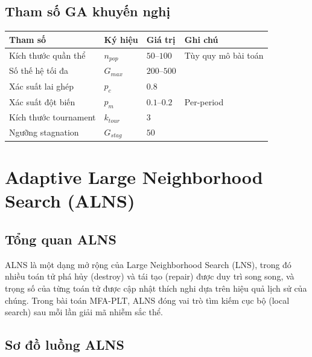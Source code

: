 \documentclass[12pt]{article}
\begin{document}
\subsection{Tham số GA khuyến nghị}

\begin{center}
\begin{tabular}{llll}
\toprule
\textbf{Tham số} & \textbf{Ký hiệu} & \textbf{Giá trị} & \textbf{Ghi chú} \\
\midrule
Kích thước quần thể & $n_{pop}$ & $50$--$100$ & Tùy quy mô bài toán \\
Số thế hệ tối đa & $G_{max}$ & $200$--$500$ & \\
Xác suất lai ghép & $p_c$ & $0.8$ & \\
Xác suất đột biến & $p_m$ & $0.1$--$0.2$ & Per-period \\
Kích thước tournament & $k_{tour}$ & $3$ & \\
Ngưỡng stagnation & $G_{stag}$ & $50$ & \\
\bottomrule
\end{tabular}
\end{center}



\section{Adaptive Large Neighborhood Search (ALNS)}

\subsection{Tổng quan ALNS}

ALNS là một dạng mở rộng của Large Neighborhood Search (LNS), trong đó nhiều toán tử phá hủy (destroy) và tái tạo (repair) được duy trì song song, và trọng số của từng toán tử được cập nhật thích nghi dựa trên hiệu quả lịch sử của chúng. Trong bài toán MFA-PLT, ALNS đóng vai trò tìm kiếm cục bộ (local search) sau mỗi lần giải mã nhiễm sắc thể.

\subsection{Sơ đồ luồng ALNS}
\end{document}
